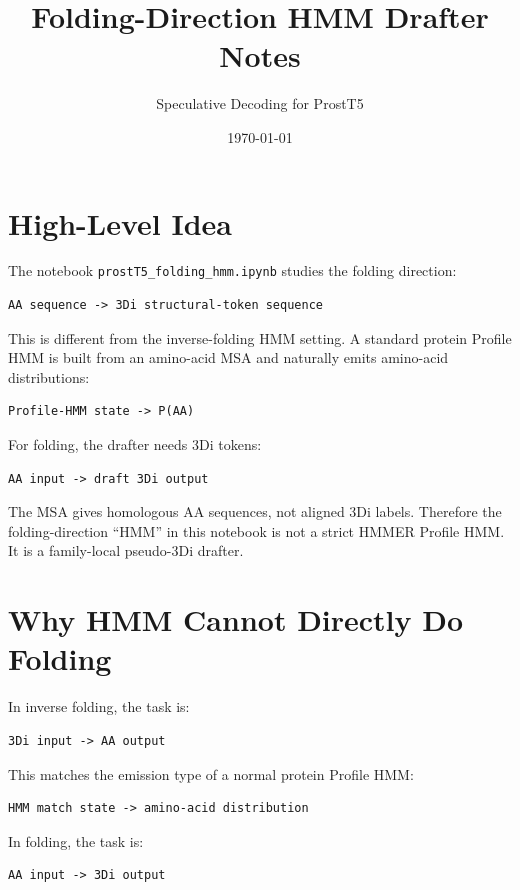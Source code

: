 \documentclass[11pt,a4paper]{article}
\title{Folding-Direction HMM Drafter Notes}
\author{Speculative Decoding for ProstT5}
\date{\today}
\begin{document}
\maketitle

\section{High-Level Idea}

The notebook \texttt{prostT5\_folding\_hmm.ipynb} studies the folding direction:

\begin{verbatim}
AA sequence -> 3Di structural-token sequence
\end{verbatim}

This is different from the inverse-folding HMM setting. A standard protein Profile HMM is built from an amino-acid MSA and naturally emits amino-acid distributions:

\begin{verbatim}
Profile-HMM state -> P(AA)
\end{verbatim}

For folding, the drafter needs 3Di tokens:

\begin{verbatim}
AA input -> draft 3Di output
\end{verbatim}

The MSA gives homologous AA sequences, not aligned 3Di labels. Therefore the folding-direction ``HMM'' in this notebook is not a strict HMMER Profile HMM. It is a family-local pseudo-3Di drafter.

\section{Why HMM Cannot Directly Do Folding}

In inverse folding, the task is:

\begin{verbatim}
3Di input -> AA output
\end{verbatim}

This matches the emission type of a normal protein Profile HMM:

\begin{verbatim}
HMM match state -> amino-acid distribution
\end{verbatim}

In folding, the task is:

\begin{verbatim}
AA input -> 3Di output
\end{verbatim}
\end{document}

